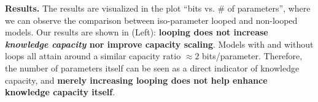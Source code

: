 \documentclass[]{bytedance_seed}
\newcommand{\1}{\mathbf{1}}
\newcommand{\zixuan}[1]{\textcolor{teal}{[ZW: #1]}}
\begin{document}
\textbf{Results.} The results are visualized in the plot ``bits vs. \# of parameters'', where we can observe the comparison between iso-parameter looped and non-looped models. Our results are shown in  (Left): \textbf{looping does not increase \textit{knowledge capacity} nor improve capacity scaling}. Models with and without loops all attain around a similar capacity ratio $\approx 2$ bits/parameter. Therefore, the number of parameters itself can be seen as a direct indicator of knowledge capacity, and \textbf{merely increasing looping does not help enhance knowledge capacity itself}.

\end{document}
